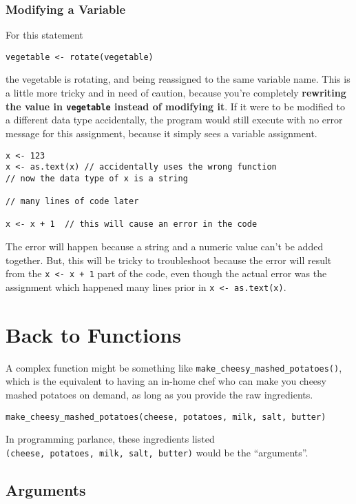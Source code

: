\documentclass[
]{book}
\begin{document}
\subsubsection{Modifying a Variable}\label{modifying-a-variable}

For this statement

\texttt{vegetable\ \textless{}-\ rotate(vegetable)}

the vegetable is rotating, and being reassigned to the same variable name. This is a little more tricky and in need of caution, because you're completely \textbf{rewriting the value in \texttt{vegetable} instead of modifying it}. If it were to be modified to a different data type accidentally, the program would still execute with no error message for this assignment, because it simply sees a variable assignment.

\begin{verbatim}
x <- 123
x <- as.text(x) // accidentally uses the wrong function
// now the data type of x is a string

// many lines of code later

x <- x + 1  // this will cause an error in the code
\end{verbatim}

The error will happen because a string and a numeric value can't be added together. But, this will be tricky to troubleshoot because the error will result from the \texttt{x\ \textless{}-\ x\ +\ 1} part of the code, even though the actual error was the assignment which happened many lines prior in \texttt{x\ \textless{}-\ as.text(x)}.

\section{Back to Functions}\label{back-to-functions}

A complex function might be something like \texttt{make\_cheesy\_mashed\_potatoes()}, which is the equivalent to having an in-home chef who can make you cheesy mashed potatoes on demand, as long as you provide the raw ingredients.

\begin{verbatim}
make_cheesy_mashed_potatoes(cheese, potatoes, milk, salt, butter)
\end{verbatim}

In programming parlance, these ingredients listed \texttt{(cheese,\ potatoes,\ milk,\ salt,\ butter)} would be the ``arguments''.

\subsection{Arguments}\label{arguments}
\end{document}
